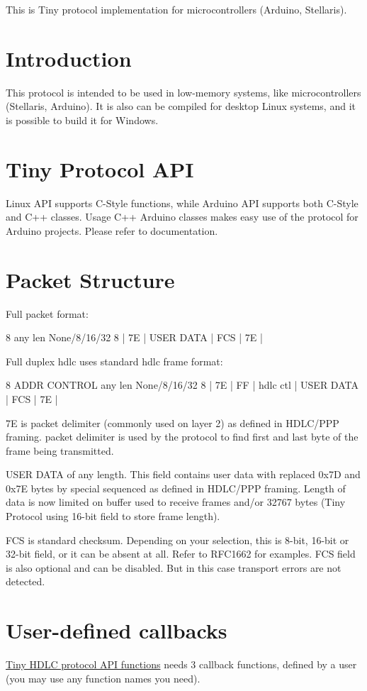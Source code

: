 This is Tiny protocol implementation for microcontrollers (Arduino, Stellaris).\hypertarget{index_introduction}{}\section{Introduction}\label{index_introduction}
This protocol is intended to be used in low-\/memory systems, like microcontrollers (Stellaris, Arduino). It is also can be compiled for desktop Linux systems, and it is possible to build it for Windows.\hypertarget{index_api}{}\section{Tiny Protocol A\+PI}\label{index_api}
Linux A\+PI supports C-\/\+Style functions, while Arduino A\+PI supports both C-\/\+Style and C++ classes. Usage C++ Arduino classes makes easy use of the protocol for Arduino projects. Please refer to documentation.\hypertarget{index_packet}{}\section{Packet Structure}\label{index_packet}
Full packet format\+: 
\begin{DoxyPre}
     8        any len    None/8/16/32     8
 |   7E   |  USER DATA  |    FCS     |   7E   |
\end{DoxyPre}


Full duplex hdlc uses standard hdlc frame format\+: 
\begin{DoxyPre}
     8     ADDR  CONTROL     any len    None/8/16/32     8
 |   7E   | FF | hdlc ctl | USER DATA  |    FCS     |   7E   |
\end{DoxyPre}



\begin{DoxyItemize}
\item 7E is packet delimiter (commonly used on layer 2) as defined in H\+D\+L\+C/\+P\+PP framing. packet delimiter is used by the protocol to find first and last byte of the frame being transmitted.
\item U\+S\+ER D\+A\+TA of any length. This field contains user data with replaced 0x7D and 0x7E bytes by special sequenced as defined in H\+D\+L\+C/\+P\+PP framing. Length of data is now limited on buffer used to receive frames and/or 32767 bytes (Tiny Protocol using 16-\/bit field to store frame length).
\item F\+CS is standard checksum. Depending on your selection, this is 8-\/bit, 16-\/bit or 32-\/bit field, or it can be absent at all. Refer to R\+F\+C1662 for examples. F\+CS field is also optional and can be disabled. But in this case transport errors are not detected.
\end{DoxyItemize}\hypertarget{index_callback}{}\section{User-\/defined callbacks}\label{index_callback}
\hyperlink{group__HDLC__API}{Tiny H\+D\+LC protocol A\+PI functions} needs 3 callback functions, defined by a user (you may use any function names you need).

